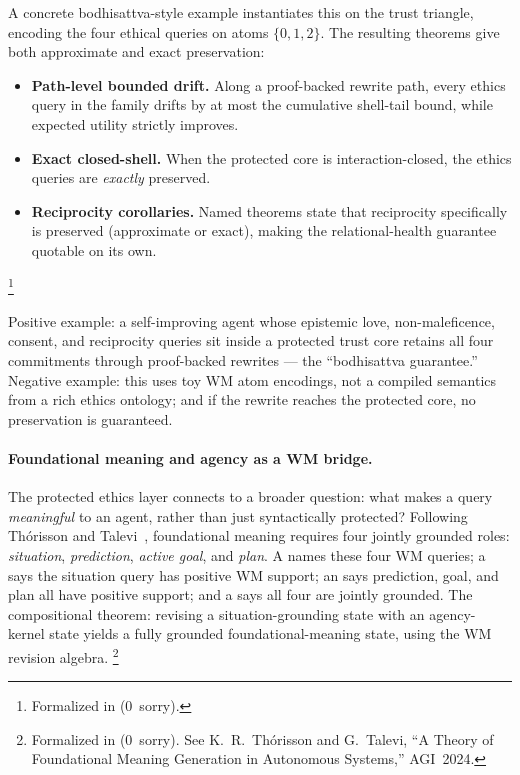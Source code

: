 \documentclass[11pt,openany]{report}
\begin{document}
A concrete bodhisattva-style example instantiates this on the trust triangle,
encoding the four ethical queries on atoms $\{0,1,2\}$.  The resulting
theorems give both approximate and exact preservation:
\begin{itemize}
\item \textbf{Path-level bounded drift.}  Along a proof-backed rewrite path,
  every ethics query in the family drifts by at most the cumulative
  shell-tail bound, while expected utility strictly improves.
\item \textbf{Exact closed-shell.}  When the protected core is
  interaction-closed, the ethics queries are \emph{exactly} preserved.
\item \textbf{Reciprocity corollaries.}  Named theorems state that
  reciprocity specifically is preserved (approximate or exact), making the
  relational-health guarantee quotable on its own.
\end{itemize}
\footnote{Formalized in
(0~sorry).}

\noindent
Positive example: a self-improving agent whose epistemic love, non-maleficence,
consent, and reciprocity queries sit inside a protected trust core retains all
four commitments through proof-backed rewrites --- the ``bodhisattva
guarantee.''
Negative example: this uses toy WM atom encodings, not a compiled semantics
from a rich ethics ontology; and if the rewrite reaches the protected core,
no preservation is guaranteed.

\paragraph{Foundational meaning and agency as a WM bridge.}

The protected ethics layer connects to a broader question: what makes
a query \emph{meaningful} to an agent, rather than just syntactically
protected?  Following Th\'orisson and Talevi~\cite{Thorisson2024Meaning},
foundational meaning requires four jointly grounded roles:
\emph{situation}, \emph{prediction}, \emph{active goal}, and \emph{plan}.
A  names these four WM queries; a
 says the situation query has positive WM support;
an  says prediction, goal, and plan all have positive
support; and a  says all four are jointly
grounded.  The compositional theorem: revising a situation-grounding state
with an agency-kernel state yields a fully grounded foundational-meaning
state, using the WM revision algebra.%
\footnote{Formalized in
(0~sorry).  See K.~R.~Th\'orisson and G.~Talevi, ``A Theory of
Foundational Meaning Generation in Autonomous Systems,'' AGI~2024.}
\end{document}
